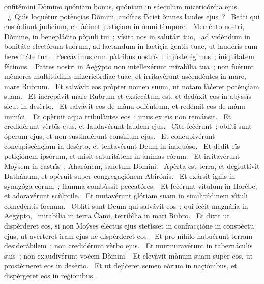 { }
{%
onfitémini Dòmino quóniam bonus, quóniam in sáeculum mizericórdia ejus. 
~¿~Quìs loquétur potènçias Dòmini, audítas fàċiet òmnes laudes ejus~? 
~Beáti qui custódiunt judìċium, et fàċiunt justìçiam in òmni tèmpore. 
~Memènto nostri, Dòmine, in benepláċito pòpuli tui~; vísita nos in salutári tuo, 
~ad vidèndum in bonitáte electórum tuórum, ad laetandum in laetìçia ġentis tuae, ut laudéris cum hereditáte tua. 
~Peccávimus cum pàtribus nostrïs~; injúste égimus~; iniquitátem féċimus. 
~Patres nostri in Aeġỳpto non intellexérunt mirabìlia tua~; non fuérunt mèmores multitúdinis mizericórdiae tuae, et irritavérunt asċendèntes in mare, mare Rubrum. 
~Et salvávit eos pròpter nomen suum, ut notam fàċeret potènçiam suam. 
~Et increpávit mare Rubrum et exsiccátum est, et dedúxit eos in abỳssïs sicut in desèrto. 
~Et salvávit eos de mànu odièntium, et redémit eos de mànu inimíci. 
~Et opèruit aqua tribulàntes eos~; unus ex eïs non remánsit. 
~Et credidérunt vèrbïs ejus, et laudavérunt laudem ejus. 
~Ċite feċérunt~; oblíti sunt óperum ejus, et non sustinuérunt consìlium ejus. 
~Et concupivérunt concupiscènçiam in desèrto, et tentavérunt Deum in inaquóso. 
~Et dèdit eïs petiçiónem ipsórum, et misit saturitátem in ànimas eórum. 
~Et irritavérunt Moýsem in castrïs~; Aharónem, sanctum Dòmini. 
~Apèrta est terra, et degluttívit Dathánum, et opèruit super congregaçiónem Abirónis. 
~Et exársit ìgnis in synagóga eórum~; flamma combùssit peccatóres. 
~Et feċérunt vìtulum in Horébe, et adoravérunt scùlptile. 
~Et mutavérunt glóriam suam in similitúdinem vìtuli comedèntis foenum. 
~Oblíti sunt Deum qui salvávit eos~; qui feċit magnália in Aeġỳpto, 
~mirabìlia in terra Ċami, terribìlia in mari Rubro. 
~Et dixit ut dispèrderet eos, si non Moýses eléctus ejus stetìsset in confracçióne in conspèctu ejus, ut avèrteret iram ejus ne dispèrderet eos. 
~Et pro nìhilo habuérunt terram desiderábilem~; non credidérunt vèrbo ejus. 
~Et murmuravérunt in tabernáculïs suïs~; non exaudivérunt voċem Dòmini. 
~Et elevávit mànum suam super eos, ut prostèrneret eos in desèrto. 
~Et ut dejìċeret semen eórum in naçiónibus, et dispèrgeret eos in reġiónibus. 
}
